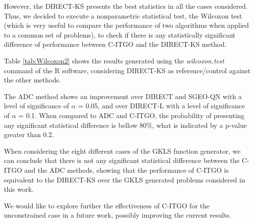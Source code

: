 However, the DIRECT-KS presents the best statistics in all the cases considered. Thus, we decided to execute a nonparametric statistical test, the Wilcoxon test \cite{Friedman} (which is very useful to compare the performance of two algorithms when applied to a common set of problems), to check if there is any statistically significant difference of performance between C-ITGO and the DIRECT-KS method.

Table \ref{tab:Wilcoxon2} shows the results generated using the \textit{wilcoxon.test} command of the R software, considering DIRECT-KS as reference/control against the other methods. 



The ADC method shows an improvement over DIRECT and SGEO-QN with a level of significance of $\alpha$ = 0.05, and over DIRECT-L with a level of significance of $\alpha$ = 0.1. When compared to ADC and C-ITGO, the probability of presenting any significant statistical difference is bellow 80\%, what is indicated by a p-value greater than 0.2. 

When considering the eight different cases of the GKLS function generator, we can conclude that there is not any significant statistical difference between the C-ITGO and the ADC methods, showing that the performance of C-ITGO is equivalent to the DIRECT-KS over the GKLS generated problems considered in this work.

We would like to explore further the effectiveness of C-ITGO for the unconstrained case in a future work, possibly improving the current results.